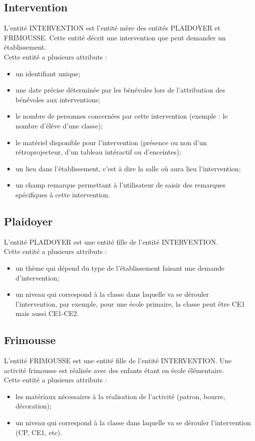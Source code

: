 \documentclass[asi, sansVersion]{picInsa}
\begin{document}
\subsection*{Intervention}
L'entité INTERVENTION est l'entité mère des entités PLAIDOYER et FRIMOUSSE. Cette entité décrit une intervention que peut demander un établissement. \\
Cette entité a plusieurs attributs :
\begin{itemize}
\item un identifiant unique;
\item une date précise déterminée par les bénévoles lors de l'attribution des bénévoles aux interventions;
\item le nombre de personnes concernées par cette intervention (exemple : le nombre d'élève d'une classe);
\item le matériel disponible pour l'intervention (présence ou non d'un rétroprojecteur, d'un tableau intéractif ou d'enceintes);
\item un lieu dans l'établissement, c'est à dire la salle où aura lieu l'intervention;
\item un champ remarque permettant à l'utilisateur de saisir des remarques spécifiques à cette intervention. 
\end{itemize}

\subsection*{Plaidoyer}
L'entité PLAIDOYER est une entité fille de l'entité INTERVENTION. \\
Cette entité a plusieurs attributs : 
\begin{itemize}
\item un thème qui dépend du type de l'établissement faisant une demande d'intervention;
\item un niveau qui correspond à la classe dans laquelle va se dérouler l'intervention, par exemple, pour une école primaire, la classe peut être CE1 mais aussi CE1-CE2.
\end{itemize}

\subsection*{Frimousse}
L'entité FRIMOUSSE est une entité fille de l'entité INTERVENTION. Une activité frimousse est réalisée avec des enfants étant en école élémentaire. \\
Cette entité a plusieurs attributs :
\begin{itemize}
\item les matériaux nécessaires à la réalisation de l'activité (patron, bourre, décoration); %
\item un niveau qui correspond à la classe dans laquelle va se dérouler l'intervention (CP, CE1, etc).
\end{itemize}
\end{document}
